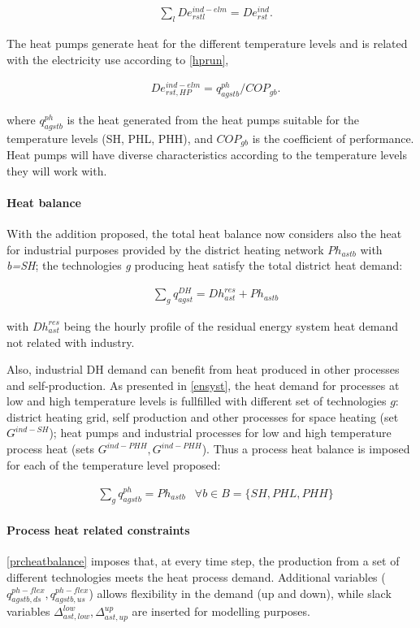 \documentclass[review]{elsarticle}
\begin{document}
\begin{align}
& \sum_{l} De^{ind-elm}_{rstl} = De^{ind}_{rst} \label{inddemand}. 
\end{align}

The heat pumps generate heat for the different temperature levels and is related with the electricity use according to \autoref{hprun},

\begin{align}
& De^{ind-elm}_{rst,HP} = q^{ph}_{agstb}/COP_{gb} \label{hprun}.
\end{align}

where $q^{ph}_{agstb}$ is the heat generated from the heat pumps suitable for the temperature levels (SH, PHL, PHH), and $COP_{gb}$ is the coefficient of performance. Heat pumps will have diverse characteristics according to the temperature levels they will work with.


\paragraph{Heat balance}
With the addition proposed, the total heat balance now considers also the heat for industrial purposes provided by the district heating network $Ph_{astb}$ with \textit{b=SH}; the technologies \textit{g} producing heat satisfy the total district heat demand:

\begin{align}
& \sum_{g} q^{DH}_{agst} = Dh^{res}_{ast} + Ph_{astb} \label{dhbalance}
\end{align}

with $Dh^{res}_{ast}$ being the hourly profile of the residual energy system heat demand not related with industry.

Also, industrial DH demand can benefit from heat produced in other processes and self-production.
As presented in \autoref{ensyst}, the heat demand for processes at low and high temperature levels is fullfilled with different set of technologies $g$: district heating grid, self production and other processes for space heating (set $G^{ind-SH}$); heat pumps and industrial processes for low and high temperature process heat (sets $G^{ind-PHH}, G^{ind-PHH}$). Thus a process heat balance is imposed for each of the temperature level proposed:

\begin{align}
& \sum_g q^{ph}_{agstb} = Ph_{astb} & \forall b \in B=\{SH, PHL, PHH\} \label{shbalance}
\end{align}

\paragraph{Process heat related constraints}
\autoref{prcheatbalance} imposes that, at every time step, the production from a set of different technologies meets the heat process demand. Additional variables ($q^{ph-flex}_{agstb,ds}, q^{ph-flex}_{agstb,us}$) allows flexibility in the demand (up and down), while slack variables $\Delta^{low}_{ast,low}, \Delta^{up}_{ast,up}$ are inserted for modelling purposes.
\end{document}
